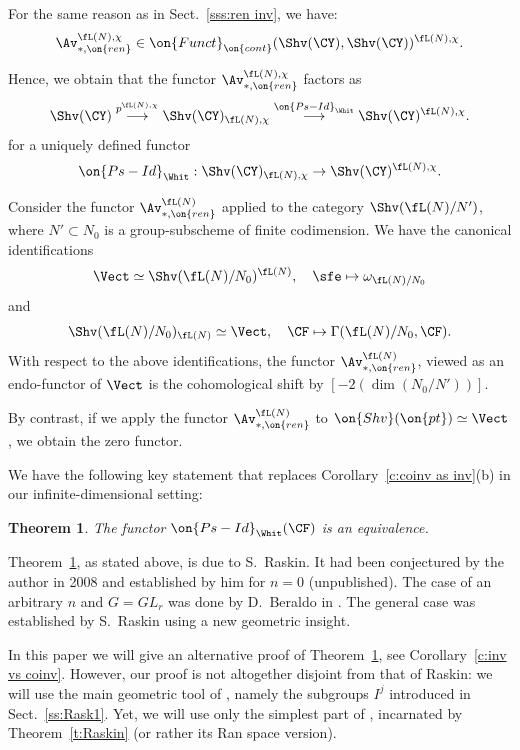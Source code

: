 \documentclass[9pt]{amsart}
\newtheorem{thm}[subsubsection]{Theorem}
\theoremstyle{definition}
\theoremstyle{remark}
\newcommand{\thmref}[1]{Theorem~\ref{#1}}
\newcommand{\secref}[1]{Sect.~\ref{#1}}
\newcommand{\corref}[1]{Corollary~\ref{#1}}
\numberwithin{equation}{section}
\begin{document}
\sssec{}   \label{sss:PsId}

For the same reason as in \secref{sss:ren inv}, we have:
$$\Av^{\fL(N),\chi}_{*,\on{ren}}\in \on{Funct}_{\on{cont}}(\Shv(\CY),\Shv(\CY))^{\fL(N),\chi}.$$

\medskip

Hence, we obtain that the functor $\Av^{\fL(N),\chi}_{*,\on{ren}}$ factors as
$$\Shv(\CY) \overset{p^{\fL(N),\chi}}\longrightarrow \Shv(\CY)_{\fL(N),\chi} \overset{\on{Ps-Id}_{\Whit}}\longrightarrow
\Shv(\CY)^{\fL(N),\chi}.$$
for a uniquely defined functor
$$\on{Ps-Id}_{\Whit}:\Shv(\CY)_{\fL(N),\chi} \to \Shv(\CY)^{\fL(N),\chi}.$$

Consider the functor $\Av^{\fL(N)}_{*,\on{ren}}$ applied to the category $\Shv(\fL(N)/N')$,
where $N'\subset N_0$ is a group-subscheme of finite codimension. We have the canonical
identifications
$$\Vect\simeq \Shv(\fL(N)/N_0)^{\fL(N)}, \quad \sfe\mapsto \omega_{\fL(N)/N_0}$$
and
$$\Shv(\fL(N)/N_0)_{\fL(N)}\simeq \Vect, \quad \CF\mapsto \Gamma(\fL(N)/N_0,\CF).$$
With respect to the above identifications, the functor $\Av^{\fL(N)}_{*,\on{ren}}$, viewed
as an endo-functor of $\Vect$ is the cohomological shift by $[-2(\dim(N_0/N'))]$.

\medskip

By contrast, if we apply the functor $\Av^{\fL(N)}_{*,\on{ren}}$ to $\on{Shv}(\on{pt})\simeq \Vect$, 
we obtain the zero functor.


\sssec{}

We have the following key statement that replaces \corref{c:coinv as inv}(b) in our infinite-dimensional setting:

\begin{thm} \label{t:inv vs coinv}
The functor $\on{Ps-Id}_{\Whit}(\CF)$ is an equivalence.
\end{thm}


\thmref{t:inv vs coinv}, as stated above, is due to S.~Raskin. It had been conjectured by the author
in 2008 and established by him for $n=0$ (unpublished). The case of an arbitrary $n$ and $G=GL_r$ was done by
D.~Beraldo in \cite{Be}. The general case was established by S.~Raskin using a new geometric insight.

\medskip

In this paper we will give an alternative proof of \thmref{t:inv vs coinv}, see \corref{c:inv vs coinv}. 
However, our proof is not altogether disjoint from that of Raskin: we will use the main geometric tool of \cite{Ras}, 
namely the subgroups $I^j$ introduced in \secref{ss:Rask1}.
Yet, we will use only the simplest part of \cite{Ras}, incarnated by \thmref{t:Raskin} (or rather its Ran space version). 
\end{document}
